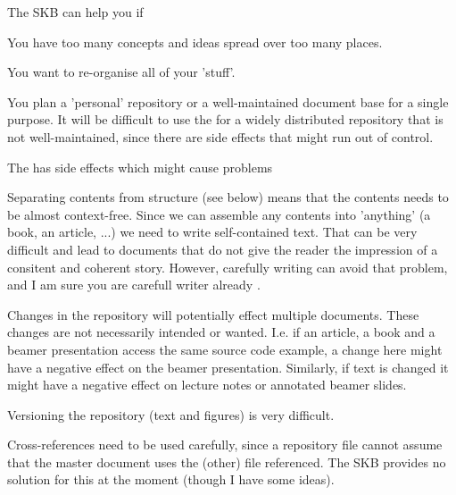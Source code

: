 
The SKB can help you if
\begin{skbnotelist}
  \item You have too many concepts and ideas spread over too many places.
  \item You want to re-organise all of your 'stuff'.
  \item You plan a 'personal' repository or a well-maintained document base for a single purpose.
        It will be difficult to use the  for a widely distributed repository that is not
        well-maintained, since there are side effects that might run out of control.
\end{skbnotelist}

The  has side effects which might cause problems
\begin{skbnotelist}
  \item Separating contents from structure (see below) means that the contents needs to be 
        almost context-free. Since we can assemble any contents into 'anything' (a book, an article, ...)
        we need to write self-contained text. That can be very difficult and lead to documents that do not give the 
        reader the impression of a consitent and coherent story. However, carefully writing can avoid that problem,
        and I am sure you are carefull writer already \smiley.
  \item Changes in the repository will potentially effect multiple documents. These changes
        are not necessarily intended or wanted. I.e. if an article, a book and a beamer
        presentation access the same source code example, a change here might have a negative
        effect on the beamer presentation. Similarly, if text is changed it might have a negative
        effect on lecture notes or annotated beamer slides.
  \item Versioning the repository (text and figures) is very difficult.
  \item Cross-references need to be used carefully, since a repository file cannot assume that 
        the master document uses the (other) file referenced. The SKB provides no solution for this 
        at the moment (though I have some ideas).
\end{skbnotelist}